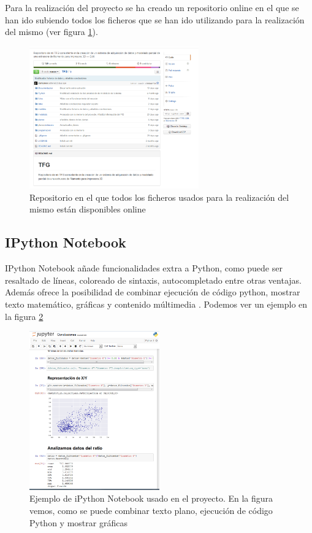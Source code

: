 Para la realización del proyecto se ha creado un repositorio online \cite{githubTFG} en el que se han ido subiendo todos los ficheros que se han ido utilizando para la realización del mismo (ver figura \ref{fig:github}).

\begin{figure}[H]
    \centering
    \includegraphics[width=0.65\textwidth]{images/github.png}
    \caption[Repositorio online del proyecto.]{Repositorio  en el que todos los ficheros usados para la realización del mismo están disponibles online}
    \label{fig:github}
\end{figure}

\subsection{IPython Notebook}
IPython Notebook añade funcionalidades extra a Python, como puede ser resaltado de líneas, coloreado de sintaxis, autocompletado entre otras ventajas. Además ofrece la posibilidad de combinar ejecución de código python, mostrar texto matemático, gráficas y contenido múltimedia \cite{ipython}. Podemos ver un ejemplo en la figura \ref{fig:ipython}

\begin{figure}[H]
    \centering
    \includegraphics[width=0.5\textwidth]{images/ipython.png}
    \caption[Ejemplo de iPython Notebook usado en el proyecto.]{Ejemplo de iPython Notebook usado en el proyecto. En la figura vemos, como se puede combinar texto plano, ejecución de código Python y mostrar gráficas}
    \label{fig:ipython}
\end{figure}

